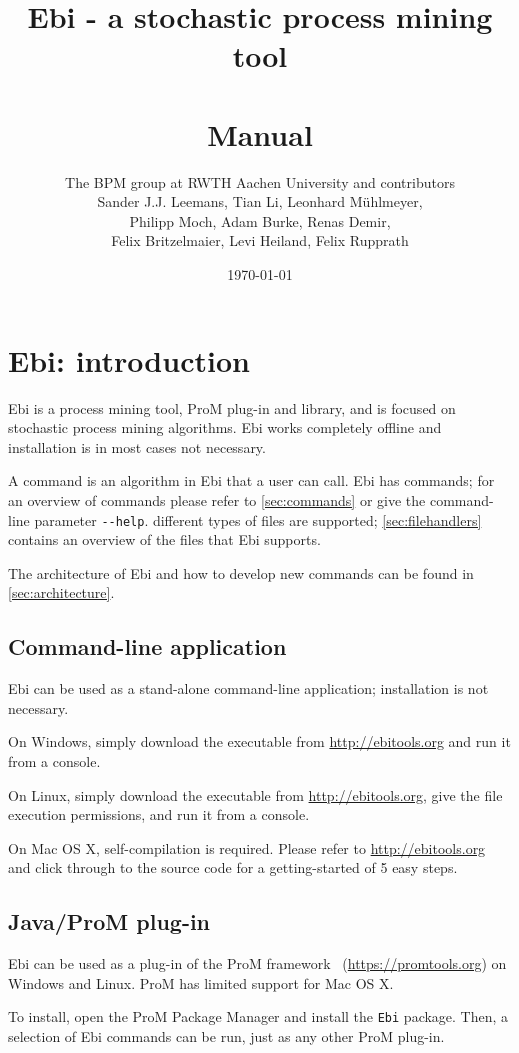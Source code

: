\documentclass{book}
\title{Ebi - a stochastic process mining tool\\{\small\version}\\Manual}
\author{The BPM group at RWTH Aachen University and contributors\\
Sander J.J. Leemans, Tian Li, Leonhard Mühlmeyer,\\
Philipp Moch, Adam Burke, Renas Demir,\\
Felix Britzelmaier, Levi Heiland, Felix Rupprath}
\date{\today}
\begin{document}
\maketitle

\tableofcontents

\clearpage
\chapter{Ebi: introduction}
	Ebi is a process mining tool, ProM plug-in and library, and is focused on stochastic process mining algorithms.
	Ebi works completely offline and installation is in most cases not necessary.
		
	A command is an algorithm in Ebi that a user can call.
	Ebi has \numberofcommands{} commands; for an overview of commands please refer to \cref{sec:commands} or give the command-line parameter \verb=--help=.
	\numberoffilehandlers{} different types of files are supported; \cref{sec:filehandlers} contains an overview of the files that Ebi supports.
	
	The architecture of Ebi and how to develop new commands can be found in \cref{sec:architecture}.
	
	\section{Command-line application}
		Ebi can be used as a stand-alone command-line application; installation is not necessary.
		
		On Windows, simply download the executable from \url{http://ebitools.org} and run it from a console.
		
		On Linux, simply download the executable from \url{http://ebitools.org}, give the file execution permissions, and run it from a console.
		
		On Mac OS X, self-compilation is required. 
		Please refer to \url{http://ebitools.org} and click through to the source code for a getting-started of 5 easy steps.
		
	\section{Java/ProM plug-in}
		Ebi can be used as a plug-in of the ProM framework~\cite{DBLP:conf/bpm/VerbeekBDA10} (\url{https://promtools.org}) on Windows and Linux. 
		ProM has limited support for Mac OS X.
		
		To install, open the ProM Package Manager and install the \verb=Ebi= package.
		Then, a selection of Ebi commands can be run, just as any other ProM plug-in.
		
\end{document}

